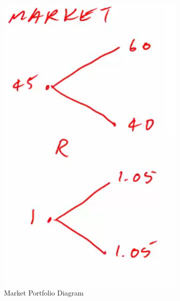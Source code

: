 \begin{example}
    \begin{figure}[h!]
        \centering
        \begin{subfigure}[b]{0.4\textwidth}
            \centering
            \includegraphics[width=\textwidth]{LECTURE_4/rep4.png}
            \caption{Market Portfolio Diagram}
            \label{fig:idiosyncratic_market_portfolio_diagram}
        \end{subfigure}
        \hfill
        \begin{subfigure}[b]{0.4\textwidth}
            \centering

\end{subfigure}
\end{figure}
\end{example}
